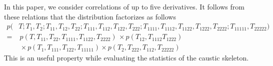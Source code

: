 \documentclass[a4paper, 11pt]{article}
\begin{document}
In this paper, we consider correlations of up to five derivatives. It follows from these relations that the distribution factorizes as follows
\begin{align}
p(&
T;
T_1,T_2;
T_{11},T_{12},T_{22};
T_{111},T_{112},T_{122},T_{222}; 
T_{1111},T_{1112},T_{1122},T_{1222},T_{2222};
T_{11111},T_{22222})\nonumber\\
=&\, p(T, T_{11},T_{22},T_{1111},T_{1122},T_{2222})
\,\times p(T_{12},T_{1112}T_{1222})\nonumber\\
&\,\times p(T_{1},T_{111},T_{122},T_{11111})
\times p(T_2,T_{222},T_{112},T_{22222})
\end{align}
This is an useful property while evaluating the statistics of the caustic skeleton.

\end{document}
